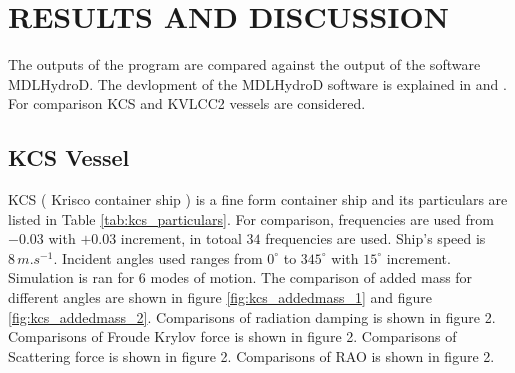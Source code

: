 \chapter{RESULTS AND DISCUSSION}
The outputs of the program are compared against the output of the software MDLHydroD. The devlopment of the 
MDLHydroD software is explained in \cite{guha2013development} and \cite{guha2015estimation}.
For comparison KCS and KVLCC2 vessels are considered. 

\section{KCS Vessel}
KCS ( Krisco container ship ) is a fine form container ship and its particulars are listed in Table \ref{tab:kcs_particulars}. For comparison, frequencies are used from
$-0.03$ with $+0.03$ increment, in totoal $34$ frequencies are used. Ship's speed is $8\,\si{m.s^{-1}}$. Incident angles used 
ranges from $0^{\circ}$ to $345^{\circ}$ with $15^{\circ}$ increment. Simulation is ran for 6 modes of motion.  
The comparison of added mass for different angles are shown in figure \ref{fig:kcs_addedmass_1} and figure \ref{fig:kcs_addedmass_2}.
Comparisons of radiation damping is shown in figure 2. Comparisons of Froude Krylov force is shown in figure 2.
Comparisons of Scattering force is shown in figure 2. Comparisons of RAO is shown in figure 2.

\begin{table}[tbp]
    \label{tb:kcs_perticulars}
    \caption[Table]{KCS principal particulars\label{tab:kcs_particulars}}
\end{table}

